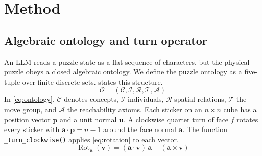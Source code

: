 \documentclass[10pt,twocolumn,letterpaper]{article}
\newcommand{\code}[1]{\texttt{#1}}
\begin{document}
\section{Method}\label{sec:method}
\subsection{Algebraic ontology and turn operator}\label{sec:ontology}
An LLM reads a puzzle state as a flat sequence of characters, but the physical puzzle obeys a closed algebraic ontology. We define the puzzle ontology as a five-tuple over finite discrete sets.  states this structure.
\begin{equation}
\mathcal{O} = (\mathcal{C}, \mathcal{I}, \mathcal{R}, \mathcal{T}, \mathcal{A})
\label{eq:ontology}
\end{equation}
In \cref{eq:ontology}, $\mathcal{C}$ denotes concepts, $\mathcal{I}$ individuals, $\mathcal{R}$ spatial relations, $\mathcal{T}$ the move group, and $\mathcal{A}$ the reachability axioms. Each sticker on an $n \times n$ cube has a position vector $\mathbf{p}$ and a unit normal $\mathbf{u}$. A clockwise quarter turn of face $f$ rotates every sticker with $\mathbf{a}\cdot\mathbf{p} = n-1$ around the face normal $\mathbf{a}$. The function \code{\_turn\_clockwise()} applies \cref{eq:rotation} to each vector.
\begin{equation}
\operatorname{Rot}_{\mathbf{a}}(\mathbf{v}) = (\mathbf{a}\cdot\mathbf{v})\,\mathbf{a} - (\mathbf{a}\times\mathbf{v})
\label{eq:rotation}
\end{equation}
\end{document}
